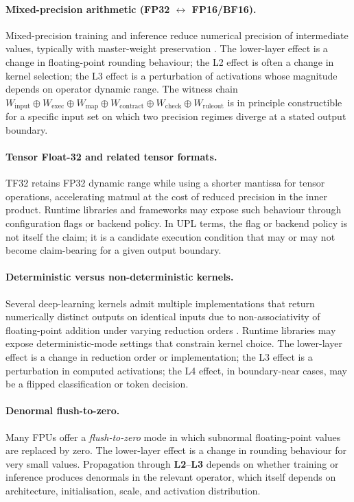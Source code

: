 \documentclass[11pt, a4paper]{article}
\theoremstyle{upldef}
\newcommand{\witness}[1]{\ensuremath{W_{\text{#1}}}}
\newcommand{\layer}[1]{\textbf{L#1}}
\begin{document}
\paragraph{Mixed-precision arithmetic
(FP32 $\leftrightarrow$ FP16/BF16).}
Mixed-precision training and inference reduce numerical precision
of intermediate values, typically with master-weight preservation
\citep{micikevicius2018}. The lower-layer effect is a change in
floating-point rounding behaviour; the L2 effect is often a change
in kernel selection; the L3 effect is a perturbation of activations
whose magnitude depends on operator dynamic range. The witness chain
$\witness{input} \oplus \witness{exec} \oplus \witness{map} \oplus
\witness{contract} \oplus \witness{check} \oplus \witness{ruleout}$
is in principle constructible for a specific input set on which two
precision regimes diverge at a stated output boundary.

\paragraph{Tensor Float-32 and related tensor formats.}
TF32 \citep{nvidia2020tf32} retains FP32 dynamic range while using a
shorter mantissa for tensor operations, accelerating matmul at the
cost of reduced precision in the inner product. Runtime libraries
and frameworks may expose such behaviour through configuration
flags or backend policy. In UPL terms, the flag or backend policy is
not itself the claim; it is a candidate execution condition that may
or may not become claim-bearing for a given output boundary.

\paragraph{Deterministic versus non-deterministic kernels.}
Several deep-learning kernels admit multiple implementations that
return numerically distinct outputs on identical inputs due to
non-associativity of floating-point addition under varying reduction
orders \citep{nagarajan2019}. Runtime libraries may expose
deterministic-mode settings that constrain kernel choice. The
lower-layer effect is a change in reduction order or implementation;
the L3 effect is a perturbation in computed activations; the L4
effect, in boundary-near cases, may be a flipped classification or
token decision.

\paragraph{Denormal flush-to-zero.}
Many FPUs offer a \emph{flush-to-zero} mode in which subnormal
floating-point values are replaced by zero. The lower-layer effect
is a change in rounding behaviour for very small values. Propagation
through \layer{2}--\layer{3} depends on whether training or inference
produces denormals in the relevant operator, which itself depends on
architecture, initialisation, scale, and activation distribution.
\end{document}
